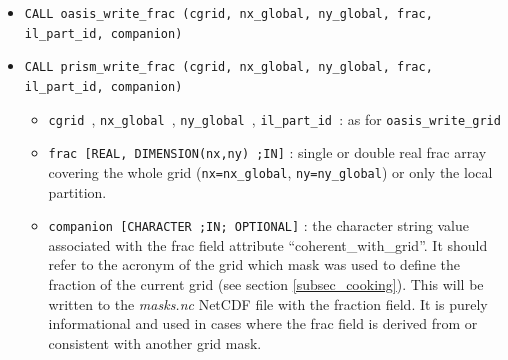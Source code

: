 \begin{itemize}
  \begin{itemize}
  \item {\tt cgrid }, {\tt nx\_global }, {\tt ny\_global }, {\tt il\_part\_id }: as for {\tt oasis\_write\_grid}
  \item {\tt mask [INTEGER, DIMENSION(nx,ny) ;IN]} : mask array
    covering the whole grid ({\tt nx=nx\_global}, {\tt ny=ny\_global})
    or only the local partition. Be careful about OASIS3-MCT
    historical convention (!): 0 = not masked (i.e. active), 1 =
    masked (i.e. not active).
  \item {\tt companion [CHARACTER ;IN; OPTIONAL]} : the character
    string value associated with the mask field attribute {\tt coherent\_with\_grid}'.  This will be written to the {\em masks.nc} netcdf file with the mask field.  It is purely informational and used in cases where the mask field is derived from or consistent with another grid.
  \end{itemize}
  Writes the component grid mask.  The mask field should be consistent
  with the frac field (see below) and will define the 0/1 mask of the
  grid cell.  The mask field is used by both the {\tt SCRIPR} map
  generation function and in the global {\tt CONSERV} operations if defined.
  The mask field is written to the {\em masks.nc} file.
  
  \vspace{0.2cm}
\item {\tt CALL oasis\_write\_frac (cgrid, nx\_global, ny\_global, frac, il\_part\_id, companion)}
\item {\tt CALL prism\_write\_frac (cgrid, nx\_global, ny\_global, frac, il\_part\_id, companion)}

  \begin{itemize}
  \item {\tt cgrid }, {\tt nx\_global }, {\tt ny\_global }, {\tt il\_part\_id }: as for {\tt oasis\_write\_grid}
  \item {\tt frac [REAL, DIMENSION(nx,ny) ;IN]} : single or double real frac array covering the whole grid ({\tt nx=nx\_global}, {\tt ny=ny\_global}) or only the local partition.  
  \item {\tt companion [CHARACTER ;IN; OPTIONAL]} : the character
    string value associated with the frac field attribute
    ``coherent\_with\_grid''.  It should refer to the acronym of
    the grid which mask was used to define the fraction of the current
    grid (see section \ref{subsec_cooking}). This will be written to the {\em
      masks.nc} NetCDF file with the fraction field.  It is purely
    informational and used in cases where the frac field is derived
    from or consistent with another grid mask.
    

\end{itemize}
\end{itemize}
